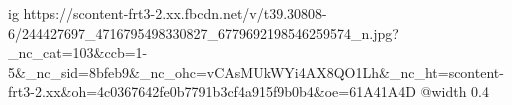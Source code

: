  
 
 
 
 

\ifcmt
  ig https://scontent-frt3-2.xx.fbcdn.net/v/t39.30808-6/244427697_4716795498330827_6779692198546259574_n.jpg?_nc_cat=103&ccb=1-5&_nc_sid=8bfeb9&_nc_ohc=vCAsMUkWYi4AX8QO1Lh&_nc_ht=scontent-frt3-2.xx&oh=4c0367642fe0b7791b3cf4a915f9b0b4&oe=61A41A4D
  @width 0.4
\fi
